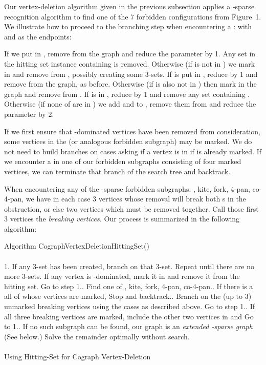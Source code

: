 \documentclass{llncs}
\begin{document}
Our vertex-deletion algorithm given in the previous subsection applies a -sparse recognition algorithm to find one of the 7 forbidden configurations from Figure~1. We illustrate how to proceed to the branching step when encountering a :  with  and  as the endpoints:

If we put  in , remove  from the graph  and reduce the parameter  by 1. Any set in the hitting set instance  containing  is removed. Otherwise (if  is not in ) we mark  in  and remove  from , possibly creating some 3-sets. If  is put in , reduce  by 1 and remove  from the graph, as before. Otherwise (if  is also not in ) then mark  in the graph and remove  from . If  is in , reduce  by 1 and remove any set containing . Otherwise (if none of  are in ) we add  and  to , remove them from  and reduce the parameter  by 2.

If we first ensure that -dominated vertices have been removed from consideration, some vertices in the  (or analogous forbidden subgraph) may be marked. We do not need to build branches on cases asking if a vertex  is in  if  is already marked. If we encounter a  in one of our forbidden subgraphs consisting of four marked vertices, we can terminate that branch of the search tree and backtrack.

When encountering any of the -sparse forbidden subgraphs: , kite, fork, 4-pan, co-4-pan, we have in each case 3 vertices whose removal will break both s in the obstruction, or else two vertices which must be removed together. Call those first 3 vertices the \emph{breaking vertices.} Our process is summarized in the following algorithm:\\


\begin{algorithm}[H]
\SetAlgoLined Algorithm {\sc CographVertexDeletionHittingSet()}\\
\ \\
1. If any 3-set has been created, branch on that 3-set. Repeat until there are no more 3-sets. If any vertex is -dominated, mark it in  and remove it from the hitting set. Go to step 1.. Find one of , kite, fork, 4-pan, co-4-pan.. If there is a  all of whose vertices are marked, {\sc Stop} and backtrack.. Branch on the (up to 3) unmarked breaking vertices using the cases as described above. Go to step 1.. If all three breaking vertices are marked, include the other two vertices in  and Go to 1.. If no such subgraph can be found, our graph is an \emph{extended -sparse graph} (See below.) Solve the remainder optimally without search.\\
\ \\
\caption{Using Hitting-Set for Cograph Vertex-Deletion}
\label{alg:cographVertexHittingSet}
\end{algorithm}
\end{document}
